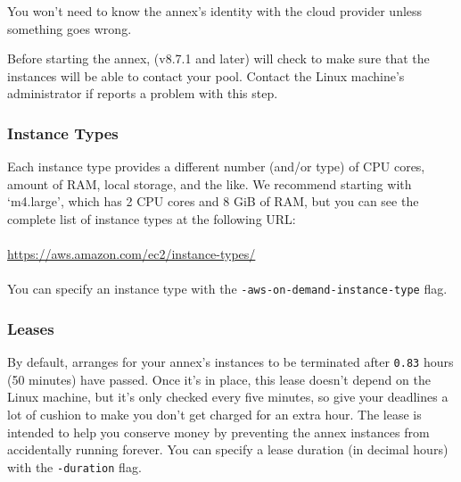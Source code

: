 
You won't need to know the annex's identity with the cloud provider unless
something goes wrong.

Before starting the annex,  (v8.7.1 and later) will check to make sure that the
instances will be able to contact your pool.  Contact the Linux machine's
administrator if  reports a problem with this step.

\subsubsection{Instance Types}

Each instance type provides a different number (and/or type) of CPU cores,
amount of RAM, local storage, and the like.  We recommend starting with
`m4.large', which has 2 CPU cores and 8 GiB of RAM, but you can see the
complete list of instance types at the following URL:\\
\\
\url{https://aws.amazon.com/ec2/instance-types/}\\
\\
You can specify an instance type with
the \texttt{-aws-on-demand-instance-type} flag.

\subsubsection{Leases}

By default,  arranges for your annex's instances to be terminated
after \texttt{0.83} hours (50 minutes) have passed.  Once it's in place, this
lease doesn't depend on the Linux machine, but it's only checked every five
minutes, so give your deadlines a lot of cushion to make you don't get charged
for an extra hour.  The lease is intended to help you conserve money by
preventing the annex instances from accidentally running forever.
You can specify a lease duration (in decimal hours)
with the \texttt{-duration} flag.

